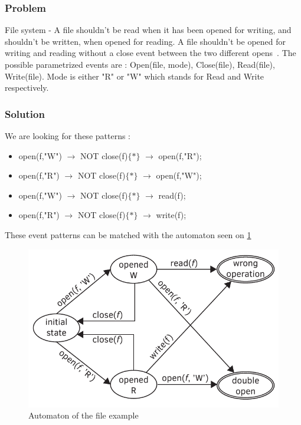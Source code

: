 			\subsubsection{Problem}
				File system - A file shouldn't be read when it has been opened for writing, and shouldn't be written, when opened for reading. 
				A file shouldn't be opened for writing and reading without a close event between the two different opens~\citep{marq}.
				The possible parametrized events are : 
				Open(file, mode), 
				Close(file), 
				Read(file), 
				Write(file). 
				Mode is either "R" or "W" which stands for Read and Write respectively.
			\subsubsection{Solution}
				We are looking for these patterns :

				\begin{itemize}
					\item open(f,"W") $\rightarrow$ NOT close(f)$\{\ast\}$ $\rightarrow$ open(f,"R");
					\item open(f,"R") $\rightarrow$ NOT close(f)$\{\ast\}$ $\rightarrow$ open(f,"W");
					\item open(f,"W") $\rightarrow$ NOT close(f)$\{\ast\}$ $\rightarrow$ read(f);
					\item open(f,"R") $\rightarrow$ NOT close(f)$\{\ast\}$ $\rightarrow$ write(f);
				\end{itemize}

				These event patterns can be matched with the automaton seen on \cref{fig:cep:fileautomaton}
				
				\begin{figure}[h]
				\centering
				\includegraphics[width=0.7\linewidth]{include/figures/chapter_5/file_example_aut}
				\caption{Automaton of the file example}
				\label{fig:cep:fileautomaton}
				\end{figure}

